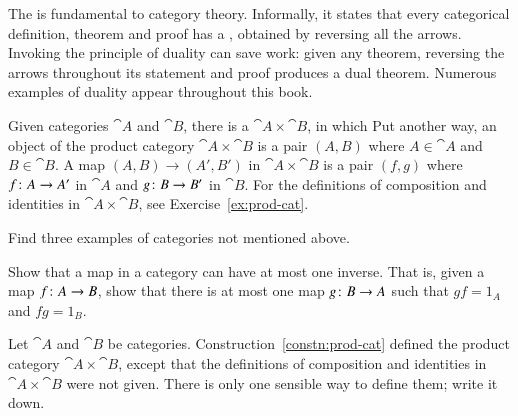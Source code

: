 \begin{remark}  
\label{rmk:principle-duality}
The %
%
%
is fundamental to category theory.  Informally, it states that every
categorical definition, theorem and proof has a , obtained by
reversing all the arrows.  Invoking the principle of duality can save work:
given any theorem, reversing the arrows throughout its statement and proof
produces a dual theorem.  Numerous examples of duality appear throughout
this book.
\end{remark}

\begin{constn}  
\label{constn:prod-cat}
Given categories $\cat{A}$ and $\cat{B}$, there is a  $\cat{A} \times \cat{B}$,%
%
%
 in which
% 
% 
Put another way, an object of the product category $\cat{A} \times \cat{B}$
is a pair $(A, B)$ where $A \in \cat{A}$ and $B \in \cat{B}$.  A map $(A,
B) \to (A', B')$ in $\cat{A} \times \cat{B}$ is a pair $(f, g)$ where
$f\from A \to A'$ in $\cat{A}$ and $g\from B \to B'$ in $\cat{B}$.  For the
definitions of composition and identities in $\cat{A} \times \cat{B}$, see
Exercise~\ref{ex:prod-cat}.
\end{constn}


\exs


\begin{question}
Find three examples of categories not mentioned above.
\end{question}


\begin{question}        
\label{ex:unique-inverse}
Show that a map in a category can have at most one inverse.  That is, given
a map $f\from A \to B$, show that there is at most one map $g\from B \to A$
such that $gf = 1_A$ and $fg = 1_B$.  
\end{question}


\begin{question}        
\label{ex:prod-cat}
Let $\cat{A}$ and $\cat{B}$ be categories.
Construction~\ref{constn:prod-cat} defined the product category $\cat{A}
\times \cat{B}$, except that the definitions of composition and identities
in $\cat{A} \times \cat{B}$ were not given.  There is only one sensible way
to define them; write it down.
\end{question}


